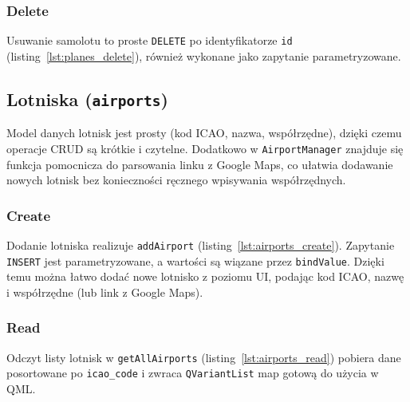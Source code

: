 \documentclass[fleqn,onecolumn,a4paper,12pt,titlepage]{article}
\begin{document}


\subsubsection{Delete}

Usuwanie samolotu to proste \texttt{DELETE} po identyfikatorze \texttt{id} (listing~\ref{lst:planes_delete}), również wykonane jako zapytanie parametryzowane.



\subsection{Lotniska (\texttt{airports})}

Model danych lotnisk jest prosty (kod ICAO, nazwa, współrzędne), dzięki czemu operacje CRUD są krótkie i czytelne. Dodatkowo w \texttt{AirportManager} znajduje się funkcja pomocnicza do parsowania linku z Google Maps, co ułatwia dodawanie nowych lotnisk bez konieczności ręcznego wpisywania współrzędnych.

\subsubsection{Create}

Dodanie lotniska realizuje \texttt{addAirport} (listing~\ref{lst:airports_create}). Zapytanie \texttt{INSERT} jest parametryzowane, a wartości są wiązane przez \texttt{bindValue}. Dzięki temu można łatwo dodać nowe lotnisko z poziomu UI, podając kod ICAO, nazwę i współrzędne (lub link z Google Maps).



\subsubsection{Read}

Odczyt listy lotnisk w \texttt{getAllAirports} (listing~\ref{lst:airports_read}) pobiera dane posortowane po \texttt{icao\_code} i zwraca \texttt{QVariantList} map gotową do użycia w QML.
\end{document}
